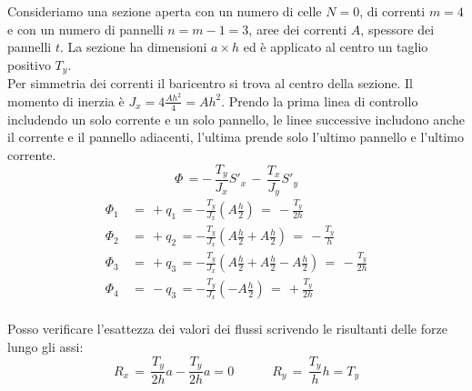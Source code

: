 \begin{esempioBox}
    Consideriamo una sezione aperta con un numero di celle $N=0$, di correnti $m=4$ e con un numero di pannelli $n=m-1=3$, aree dei correnti $A$, spessore dei pannelli $t$. La sezione ha dimensioni $a\times h$ ed è applicato al centro un taglio positivo $T_y$.\\
    Per simmetria dei correnti il baricentro si trova al centro della sezione. Il momento di inerzia è $J_x = 4\frac{Ah^2}{4}=Ah^2$. Prendo la prima linea di controllo includendo un solo corrente e un solo pannello, le linee successive includono anche il corrente e il pannello adiacenti, l'ultima prende solo l'ultimo pannello e l'ultimo corrente.
    \begin{equation*}
       \Phi\, = -\, \frac{T_y}{J_x}S'_x  \,-\, \frac{T_x}{J_y}S'_y 
    \end{equation*}
    \begin{align*}
        \Phi_1 \,&=\, +q_1 \,= -\frac{T_y}{J_x}\left( A\frac{h}{2} \right) \,=\, -\frac{T_y}{2h}\\
         \Phi_2 \,&=\, +q_2 \,=  -\frac{T_y}{J_x}\left( A\frac{h}{2}+A\frac{h}{2} \right) \,=\, -\frac{T_y}{h}\\
          \Phi_3 \,&=\, +q_3 \,=  -\frac{T_y}{J_x}\left( A\frac{h}{2}+A\frac{h}{2}-A\frac{h}{2} \right) \,=\, -\frac{T_y}{2h}\\
           \Phi_4 \,&=\, -q_3 \,=  -\frac{T_y}{J_x}\left( -A\frac{h}{2} \right) \,=\, +\frac{T_y}{2h}\\
    \end{align*}


Posso verificare l'esattezza dei valori dei flussi scrivendo le risultanti delle forze lungo gli assi:
\begin{equation*}
    R_x\, = \, \frac{T_y}{2h}a-\frac{T_y}{2h}a=0  \quad\quad\quad R_y\, = \, \frac{T_y}{h}h = T_y
\end{equation*}


\end{esempioBox}
